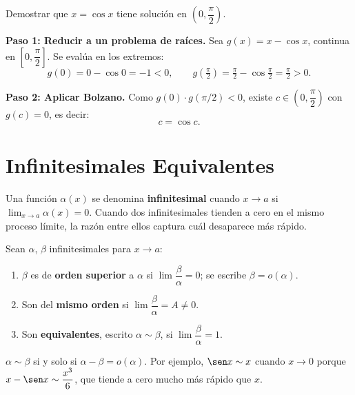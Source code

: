 \begin{example}[La ecuación $x=\cos x$ tiene solución en $(0,\pi/2)$]
Demostrar que $x=\cos x$ tiene solución en $\left(0,\dfrac{\pi}{2}\right)$.

\begin{myproof}
\textbf{Paso 1: Reducir a un problema de raíces.} Sea $g(x)=x-\cos x$, continua en $\left[0,\dfrac{\pi}{2}\right]$. Se evalúa en los extremos:
\[
  g(0) = 0-\cos 0 = -1 < 0, \qquad
  g\!\left(\tfrac{\pi}{2}\right) = \tfrac{\pi}{2}-\cos\tfrac{\pi}{2} = \tfrac{\pi}{2} > 0.
\]

\textbf{Paso 2: Aplicar Bolzano.} Como $g(0)\cdot g(\pi/2)<0$, existe $c\in\!\left(0,\dfrac{\pi}{2}\right)$ con $g(c)=0$, es decir:
\[
  \boxed{c = \cos c.}
\]
\end{myproof}
\end{example}

\section{Infinitesimales Equivalentes}
Una función $\alpha(x)$ se denomina \textbf{infinitesimal} cuando $x\to a$
si $\lim_{x\to a}\alpha(x)=0$. Cuando dos infinitesimales tienden a cero en
el mismo proceso límite, la razón entre ellos captura cuál desaparece más
rápido.

\begin{definition}
Sean $\alpha$, $\beta$ infinitesimales para $x\to a$:
\begin{enumerate}
  \item $\beta$ es de \textbf{orden superior} a $\alpha$ si
        $\lim\dfrac{\beta}{\alpha}=0$; se escribe $\beta=o(\alpha)$.
  \item Son del \textbf{mismo orden} si $\lim\dfrac{\beta}{\alpha}=A\neq 0$.
  \item Son \textbf{equivalentes}, escrito $\alpha\sim\beta$, si
        $\lim\dfrac{\beta}{\alpha}=1$.
\end{enumerate}
\end{definition}

\begin{rem}
$\alpha\sim\beta$ si y solo si $\alpha-\beta = o(\alpha)$. Por ejemplo,
$\sen x\sim x$ cuando $x\to 0$ porque $x-\sen x\sim\dfrac{x^3}{6}$, que
tiende a cero mucho más rápido que $x$.
\end{rem}

